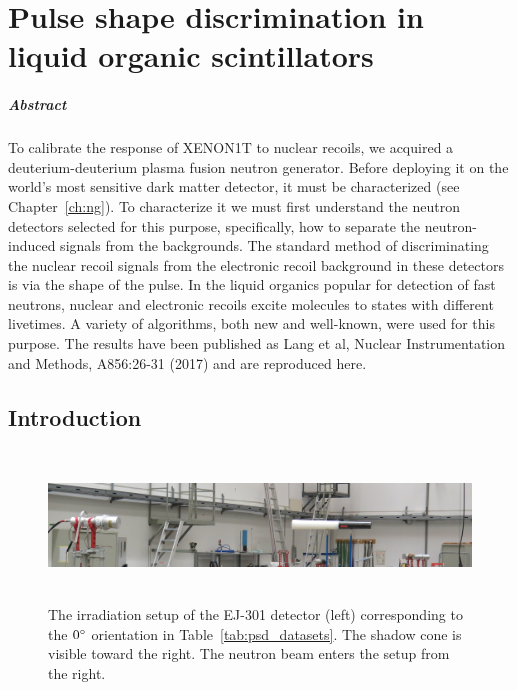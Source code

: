 
\chapter{Pulse shape discrimination in liquid organic scintillators}\label{ch:psd}

\paragraph{Abstract} To calibrate the response of XENON1T to nuclear recoils, we acquired a deuterium-deuterium plasma fusion neutron generator. Before deploying it on the world's most sensitive dark matter detector, it must be characterized (see Chapter~\ref{ch:ng}). To characterize it we must first understand the neutron detectors selected for this purpose, specifically, how to separate the neutron-induced signals from the backgrounds. The standard method of discriminating the nuclear recoil signals from the electronic recoil background in these detectors is via the shape of the pulse. In the liquid organics popular for detection of fast neutrons, nuclear and electronic recoils excite molecules to states with different livetimes. A variety of algorithms, both new and well-known, were used for this purpose. The results have been published as Lang et al, Nuclear Instrumentation and Methods, A856:26-31 (2017) and are reproduced here.

\section{Introduction}

\begin{figure}[htbp]
\centering
    \includegraphics[width=\textwidth,height=4cm]{figures/psd/fig_ptb_setup}
    \caption{The irradiation setup of the EJ-301 detector (left) corresponding to the $0{}^{\circ}$ orientation in Table~\ref{tab:psd_datasets}. The shadow cone is visible toward the right. The neutron beam enters the setup from the right.}\label{fig:psd_detector_setup}
\end{figure}

